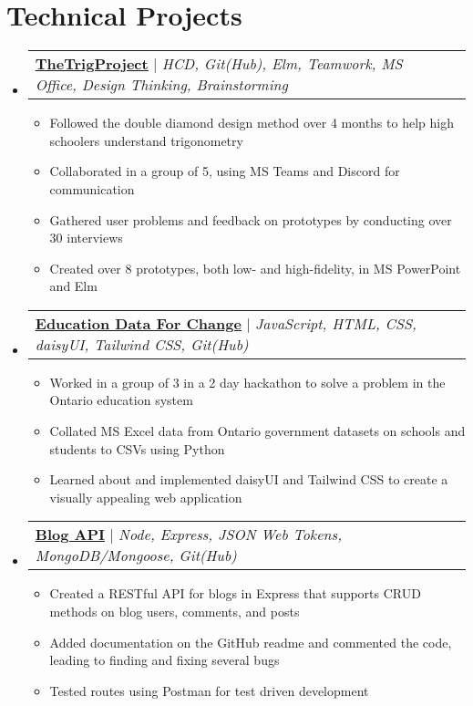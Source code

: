 \documentclass[letterpaper,11pt]{article}
\makeatletter
\newcommand{\resumeItem}[1]{
	\item\small{
		{#1 \vspace{-2pt}}
	}
}
\newcommand{\resumeProjectHeading}[2]{
	\item
	\begin{tabular*}{0.97\textwidth}{l@{\extracolsep{\fill}}r}
		\small#1 & #2 \\
	\end{tabular*}\vspace{-7pt}
}
\newcommand{\resumeSubHeadingListStart}{\begin{itemize}[leftmargin=0.15in,
			label={}]}
\newcommand{\resumeSubHeadingListEnd}{\end{itemize}}
\newcommand{\resumeItemListStart}{\begin{itemize}}
\newcommand{\resumeItemListEnd}{\end{itemize}\vspace{-5pt}}
\makeatother
\begin{document}
\section{Technical Projects}
\resumeSubHeadingListStart

\resumeProjectHeading{\href{https://github.com/youcefs21/TheTrigProject}{\underline{\textbf{TheTrigProject}}}
	$|$ \emph{HCD, Git(Hub), Elm, Teamwork, MS Office, Design Thinking, Brainstorming}}{}
\resumeItemListStart
\resumeItem{Followed the double diamond design method over 4 months to help high schoolers understand trigonometry}
\resumeItem{Collaborated in a group of 5, using MS Teams and Discord for communication}
\resumeItem{Gathered user problems and feedback on prototypes by conducting over 30 interviews}
\resumeItem{Created over 8 prototypes, both low- and high-fidelity, in MS PowerPoint and Elm}
\resumeItemListEnd

\resumeProjectHeading{\href{https://github.com/owengretzinger/education-data-for-change}{\underline{\textbf{Education Data For Change}}} $|$ \emph{JavaScript, HTML, CSS, daisyUI, Tailwind CSS, Git(Hub)}}{}
\resumeItemListStart
\resumeItem{Worked in a group of 3 in a 2 day hackathon to solve a problem in the Ontario education system}
\resumeItem{Collated MS Excel data from Ontario government datasets on schools and students to CSVs using Python}
\resumeItem{Learned about and implemented daisyUI and Tailwind CSS to create a visually appealing web application}
\resumeItemListEnd

\resumeProjectHeading{\href{https://github.com/geon-youn/blog-api}{\underline{\textbf{Blog API}}} $|$ \emph{Node, Express, JSON Web Tokens, MongoDB/Mongoose, Git(Hub)}}{}
\resumeItemListStart
\resumeItem{Created a RESTful API for blogs in Express that supports CRUD methods on blog users, comments, and posts}
\resumeItem{Added documentation on the GitHub readme and commented the code, leading to finding and fixing several bugs}
\resumeItem{Tested routes using Postman for test driven development}
\resumeItemListEnd


\resumeSubHeadingListEnd

\end{document}
